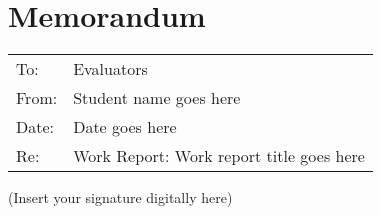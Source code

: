 \section*{Memorandum}

\bigskip

\begin{tabular}{@{}ll}
	To: & Evaluators \\
	
	From: & Student name goes here \\
	
	Date: & Date goes here \\
	
	Re: & Work Report: Work report title goes here
\end{tabular}

\hrulefill

\lipsum[1-3]


(Insert your signature digitally here)